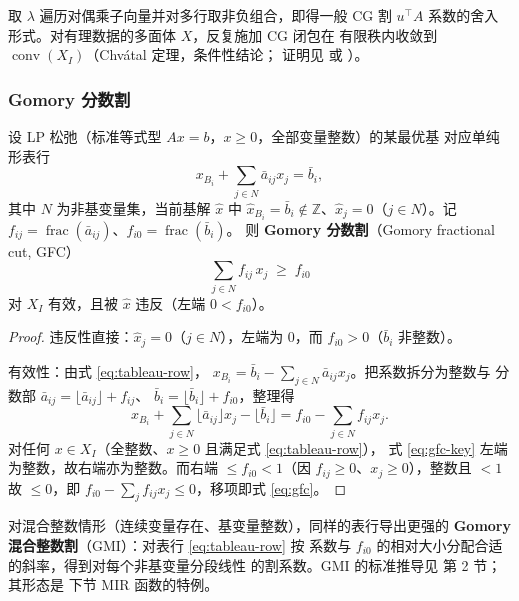 取 $\lambda$ 遍历对偶乘子向量并对多行取非负组合，即得一般 CG 割
$u^\top A$ 系数的舍入形式。对有理数据的多面体 $X$，反复施加 CG 闭包在
有限秩内收敛到 $\operatorname{conv}(X_I)$（Chv\'atal 定理，条件性结论；
证明见 \cite{cornuejols2008} 或 \cite{nemhauser1988}）。

\subsubsection{Gomory 分数割}

\begin{theorem}
\label{thm:gfc}
设 LP 松弛（标准等式型 $Ax = b$，$x \ge 0$，全部变量整数）的某最优基
对应单纯形表行
\begin{equation}
\label{eq:tableau-row}
x_{B_i} + \sum_{j \in N} \bar a_{ij} x_j = \bar b_i,
\end{equation}
其中 $N$ 为非基变量集，当前基解 $\hat x$ 中
$\hat x_{B_i} = \bar b_i \notin \mathbb{Z}$、$\hat x_j = 0$（$j \in N$）。记
$f_{ij} = \operatorname{frac}(\bar a_{ij})$、$f_{i0} = \operatorname{frac}(\bar b_i)$。
则 \textbf{Gomory 分数割}（Gomory fractional cut, GFC）
\begin{equation}
\label{eq:gfc}
\sum_{j \in N} f_{ij}\, x_j \;\ge\; f_{i0}
\end{equation}
对 $X_I$ 有效，且被 $\hat x$ 违反（左端 $0 < f_{i0}$）。
\end{theorem}
\begin{proof}
违反性直接：$\hat x_j = 0$（$j \in N$），左端为 0，而
$f_{i0} > 0$（$\bar b_i$ 非整数）。

有效性：由式 \eqref{eq:tableau-row}，
$x_{B_i} = \bar b_i - \sum_{j \in N}\bar a_{ij} x_j$。把系数拆分为整数与
分数部 $\bar a_{ij} = \lfloor\bar a_{ij}\rfloor + f_{ij}$、
$\bar b_i = \lfloor\bar b_i\rfloor + f_{i0}$，整理得
\begin{equation}
\label{eq:gfc-key}
x_{B_i} + \sum_{j \in N}\lfloor\bar a_{ij}\rfloor x_j - \lfloor\bar b_i\rfloor
= f_{i0} - \sum_{j \in N} f_{ij} x_j .
\end{equation}
对任何 $x \in X_I$（全整数、$x \ge 0$ 且满足式 \eqref{eq:tableau-row}），
式 \eqref{eq:gfc-key} 左端为整数，故右端亦为整数。而右端
$\le f_{i0} < 1$（因 $f_{ij} \ge 0$、$x_j \ge 0$），整数且 $< 1$ 故
$\le 0$，即 $f_{i0} - \sum_j f_{ij} x_j \le 0$，移项即式 \eqref{eq:gfc}。
\end{proof}

对混合整数情形（连续变量存在、基变量整数），同样的表行导出更强的
\textbf{Gomory 混合整数割}（GMI）：对表行 \eqref{eq:tableau-row} 按
系数与 $f_{i0}$ 的相对大小分配合适的斜率，得到对每个非基变量分段线性
的割系数。GMI 的标准推导见 \cite{cornuejols2008} 第 2 节；其形态是
下节 MIR 函数的特例。

